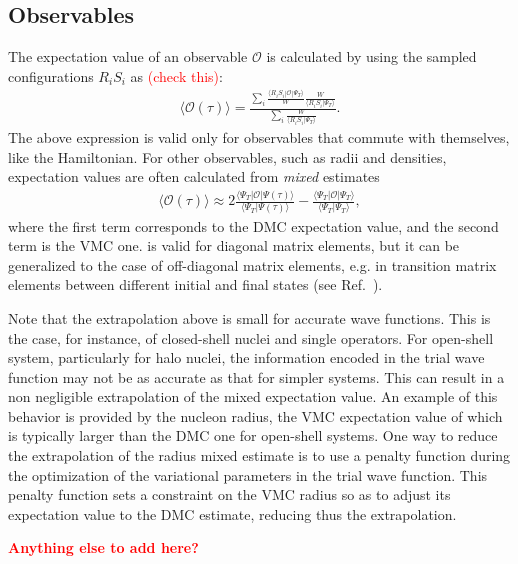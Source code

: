 \documentclass[aps,prc,twocolumn,superscriptaddress,floatfix]{revtex4-1}
\newcommand{\red}[1]{\protect\textcolor{red}{#1}}
\begin{document}
\subsection{Observables}
\label{sec:obs}
The expectation value of an observable $\mathcal O$ is calculated by using the sampled configurations $R_iS_i$ as \red{(check this)}:
\begin{align}
\displaystyle\langle \mathcal O(\tau)\rangle=\frac{\displaystyle\sum_i \frac{\langle R_iS_i|\mathcal O|\Psi_T\rangle}{W}\frac{W}{\langle R_iS_i|\Psi_T\rangle}}
{\displaystyle\sum_i\frac{W}{\langle R_iS_i|\Psi_T\rangle}}.
\label{eq:obs}
\end{align}
The above expression is valid only for observables that commute with themselves, like the Hamiltonian.
For other observables, such as radii and densities, expectation values are often calculated from \emph{mixed} estimates 
\begin{align}
\langle\mathcal O(\tau)\rangle\approx2\frac{\langle\Psi_T|\mathcal O|\Psi(\tau)\rangle}{\langle\Psi_T|\Psi(\tau)\rangle}
-\frac{\langle\Psi_T|\mathcal O|\Psi_T\rangle}{\langle\Psi_T|\Psi_T\rangle}	,
\label{eq:mix}
\end{align}
where the first term corresponds to the DMC expectation value, and the second term is the VMC one.
 is valid for diagonal matrix elements, but it can be generalized to the case of off-diagonal matrix 
elements, e.g. in transition matrix elements between different initial and final states
(see Ref.~\cite{Pervin:2007}). 

Note that the extrapolation above is small for accurate wave functions.
This is the case, for instance, of closed-shell nuclei and single operators.
For open-shell system, particularly for halo nuclei, the information encoded in the trial
wave function may not be as accurate as that for simpler systems. This can result in
a non negligible extrapolation of the mixed expectation value.
An example of this behavior is provided by the nucleon radius, 
the VMC expectation value of which is typically larger than the DMC one
for open-shell systems. One way to reduce the extrapolation of the radius mixed estimate
is to use a penalty function during the optimization of the variational parameters 
in the trial wave function. This penalty function sets a constraint on the VMC radius so as to
adjust its expectation value to the DMC estimate, reducing thus the extrapolation.

\red{\bf Anything else to add here?}
\end{document}
